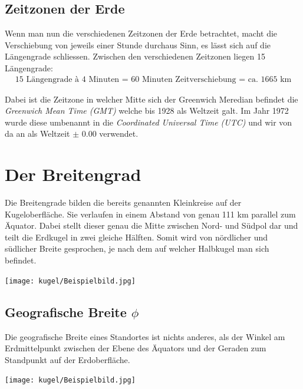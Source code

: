 \begin{refsection}
\subsection{Zeitzonen der Erde}
Wenn man nun die verschiedenen Zeitzonen der Erde betrachtet, macht die Verschiebung von jeweils einer Stunde durchaus Sinn, es lässt sich auf die Längengrade schliessen.
Zwischen den verschiedenen Zeitzonen liegen 15 Längengrade:
\begin{align*}
\text{15 Längengrade à 4 Minuten = 60 Minuten Zeitverschiebung = ca. 1665 km}
\end{align*}

Dabei ist die Zeitzone in welcher Mitte sich der Greenwich Meredian befindet die \textit{Greenwich Mean Time (GMT)} welche bis 1928 als Weltzeit galt. Im Jahr 1972 wurde diese umbenannt in die \textit{Coordinated Universal Time (UTC)} und wir von da an als Weltzeit $\pm$ 0.00 verwendet.


\section{Der Breitengrad}
Die Breitengrade bilden die bereits genannten Kleinkreise auf der Kugeloberfläche. Sie verlaufen in einem Abstand von genau 111 km parallel zum Äquator. Dabei stellt  dieser genau die Mitte zwischen Nord- und Südpol dar und teilt die Erdkugel in zwei gleiche Hälften. Somit wird von nördlicher und südlicher Breite gesprochen, je nach dem auf welcher Halbkugel man sich befindet.

\begin{center}
        \texttt{[image: kugel/Beispielbild.jpg]}
\end{center}


\subsection{Geografische Breite $\phi$}
\begin{definition}
Die geografische Breite eines Standortes ist nichts anderes, als der Winkel am Erdmittelpunkt zwischen der Ebene des Äquators und der Geraden zum Standpunkt auf der Erdoberfläche.
\end{definition}

\begin{center}
        \texttt{[image: kugel/Beispielbild.jpg]}
\end{center}



\end{refsection}
